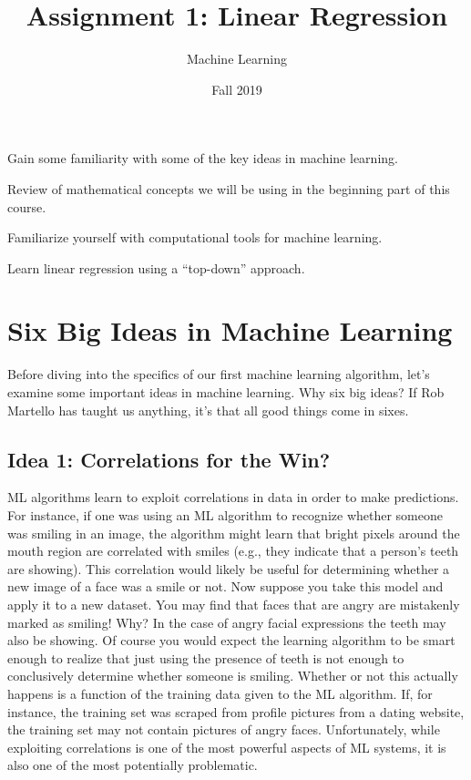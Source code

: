 \documentclass[assignment01_Solutions]{subfiles}
\title{Assignment 1: Linear Regression}
\author{Machine Learning}
\date{Fall 2019}
\begin{document}
\maketitle
\thispagestyle{firstpage}


\begin{learningobjectives}
\bi
\item Gain some familiarity with some of the key ideas in machine learning.
\item Review of mathematical concepts we will be using in the beginning part of this course.
\item Familiarize yourself with computational tools for machine learning.
\item Learn linear regression using a ``top-down'' approach.
\ei
\end{learningobjectives}


\section{Six Big Ideas in Machine Learning}
Before diving into the specifics of our first machine learning algorithm, let's examine some important ideas in machine learning.  Why six big ideas?  If Rob Martello has taught us anything, it's that all good things come in sixes.


\subsection*{Idea 1: Correlations for the Win?}
ML algorithms learn to exploit correlations in data in order to make predictions.  For instance, if one was using an ML algorithm to recognize whether someone was smiling in an image, the algorithm might learn that bright pixels around the mouth region are correlated with smiles (e.g., they indicate that a person's teeth are showing).  This correlation would likely be useful for determining whether a new image of a face was a smile or not.  Now suppose you take this model and apply it to a new dataset.  You may find that faces that are angry are mistakenly marked as smiling!  Why?  In the case of angry facial expressions the teeth may also be showing.  Of course you would expect the learning algorithm to be smart enough to realize that just using the presence of teeth is not enough to conclusively determine whether someone is smiling.  Whether or not this actually happens is a function of the training data given to the ML algorithm.  If, for instance, the training set was scraped from profile pictures from a dating website, the training set may not contain pictures of angry faces.  Unfortunately, while exploiting correlations is one of the most powerful aspects of ML systems, it is also one of the most potentially problematic.
\end{document}

